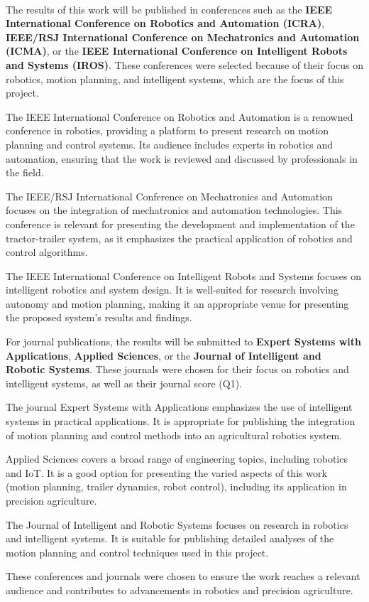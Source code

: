 \paragraph{}The results of this work will be published in conferences such as the \textbf{IEEE International Conference on Robotics 
and Automation (ICRA)}, \textbf{IEEE/RSJ International Conference on Mechatronics and Automation (ICMA)}, or the 
\textbf{IEEE International Conference on Intelligent Robots and Systems (IROS)}. These conferences were 
selected because of their focus on robotics, motion planning, and intelligent systems, which are the focus of this project.

The IEEE International Conference on Robotics and Automation is a renowned conference in robotics, 
providing a platform to present research on motion planning and control systems. Its audience includes experts 
in robotics and automation, ensuring that the work is reviewed and discussed by professionals in the field.

The IEEE/RSJ International Conference on Mechatronics and Automation focuses on the integration of mechatronics 
and automation technologies. This conference is relevant for presenting the development and implementation of the 
tractor-trailer system, as it emphasizes the practical application of robotics and control algorithms.

The IEEE International Conference on Intelligent Robots and Systems focuses on intelligent robotics and system 
design. It is well-suited for research involving autonomy and motion planning, making it an appropriate venue for presenting 
the proposed system’s results and findings.

For journal publications, the results will be submitted to \textbf{Expert Systems with Applications}, \textbf{Applied Sciences}, 
or the \textbf{Journal of Intelligent and Robotic Systems}. These journals were chosen for their focus on robotics and intelligent systems, as 
well as their journal score (Q1).

The journal Expert Systems with Applications emphasizes the use of intelligent systems in practical applications. 
It is appropriate for publishing the integration of motion planning and control methods into an agricultural robotics system.

Applied Sciences covers a broad range of engineering topics, including robotics and IoT. It is a good option 
for presenting the varied aspects of this work (motion planning, trailer dynamics, robot control), including its application in precision 
agriculture.

The Journal of Intelligent and Robotic Systems focuses on research in robotics and intelligent systems. It is suitable 
for publishing detailed analyses of the motion planning and control techniques used in this project.

These conferences and journals were chosen to ensure the work reaches a relevant audience and contributes to advancements 
in robotics and precision agriculture.